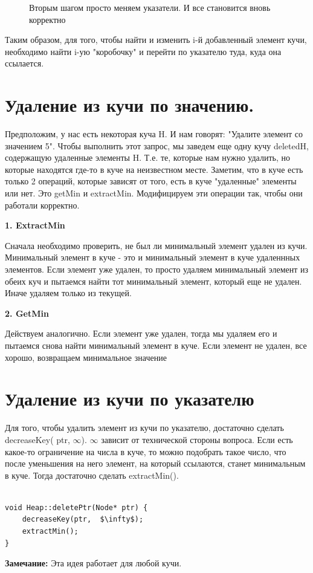 \begin{figure}[h]
\caption {Вторым шагом просто меняем указатели. И все становится вновь корректно}
\label{ris:image}
\end{figure}

Таким образом, для того, чтобы найти и изменить i-й добавленный элемент кучи, необходимо найти i-ую "коробочку" и перейти по указателю туда, куда она ссылается.

\section{Удаление из кучи по значению.}

Предположим, у нас есть некоторая куча H. И нам говорят: "Удалите элемент со значением 5". Чтобы выполнить этот запрос, мы заведем еще одну кучу deletedH, содержащую удаленные элементы H. Т.е. те, которые нам нужно удалить, но которые находятся где-то в куче на неизвестном месте. 
Заметим, что в куче есть только 2 операций, которые зависят от того, есть в куче "удаленные"  элементы или нет. Это getMin и extractMin. 
Модифицируем эти операции так, чтобы они работали корректно.

\textbf{1. ExtractMin }

Сначала необходимо проверить, не был ли минимальный элемент удален из кучи. Минимальный элемент в куче - это и минимальный элемент в куче удаленнных элементов. Если элемент уже удален, то просто удаляем минимальный элемент из обеих куч и пытаемся найти тот минимальный элемент, который еще не удален. Иначе удаляем только из текущей.

\textbf{2. GetMin }

Действуем аналогично. Если элемент уже удален, тогда мы удаляем его и пытаемся снова найти минимальный элемент в куче. Если элемент не удален, все хорошо, возвращаем минимальное значение

\section{Удаление из кучи по указателю}
Для того, чтобы удалить элемент из кучи по указателю, достаточно сделать decreaseKey( ptr, $\infty$). $\infty$ зависит от технической стороны вопроса. Если есть какое-то ограничение на числа в куче, то можно подобрать такое число, что после уменьшения на него элемент, на который ссылаются, станет минимальным в куче. Тогда достаточно сделать extractMin().

\begin{lstlisting}

void Heap::deletePtr(Node* ptr) {
	decreaseKey(ptr,  $\infty$);
	extractMin();
}
\end{lstlisting}

\textbf{Замечание:} Эта идея работает для любой кучи.